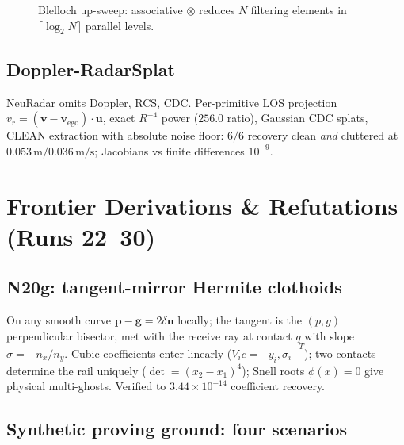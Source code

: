 \documentclass[11pt,oneside]{book}
\begin{document}
\begin{figure}[htbp]
\centering
{}
\caption{Blelloch up-sweep: associative $\otimes$ reduces $N$ filtering
elements in $\lceil\log_2N\rceil$ parallel levels.}
\label{fig:blelloch}
\end{figure}

\section{Doppler-RadarSplat}
\label{ch:radarsplat}

NeuRadar omits Doppler, RCS, CDC. Per-primitive LOS projection
$v_{r}=(\mathbf{v}-\mathbf{v}_{\mathrm{ego}})\!\cdot\!\mathbf{u}$,
exact $R^{-4}$ power ($256.0$ ratio), Gaussian CDC splats, CLEAN extraction
with absolute noise floor: $6/6$ recovery clean \emph{and} cluttered at
$0.053\,\mathrm{m}/0.036\,\mathrm{m/s}$; Jacobians vs finite differences
$10^{-9}$.

\chapter{Frontier Derivations \& Refutations (Runs 22--30)}
\label{ch:frontier}

\section{N20g: tangent-mirror Hermite clothoids}
\label{sec:n20g}

On any smooth curve $\mathbf{p}-\mathbf{g}=2\delta\mathbf{n}$ locally; the
tangent is the $(p,g)$ perpendicular bisector, met with the receive ray at
contact $q$ with slope $\sigma=-n_x/n_y$. Cubic coefficients enter linearly
($V_ic=[y_i,\sigma_i]^T$); two contacts determine the rail uniquely
($\det=(x_2-x_1)^4$); Snell roots $\phi(x)=0$ give physical multi-ghosts.
Verified to $3.44\times10^{-14}$ coefficient recovery.

\section{Synthetic proving ground: four scenarios}
\label{sec:scenarios}
\end{document}
